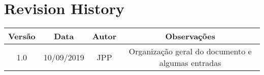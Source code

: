 \chapter*{Revision History}

\begin{center}
    \begin{tabular}{|c|c|c|c|}
        \hline
	    Versão & Data & Autor & Observações\\
        \hline
	    1.0 & 10/09/2019 & JPP & Organização geral do documento e algumas entradas\\
        \hline
        \hline
    \end{tabular}
\end{center}
